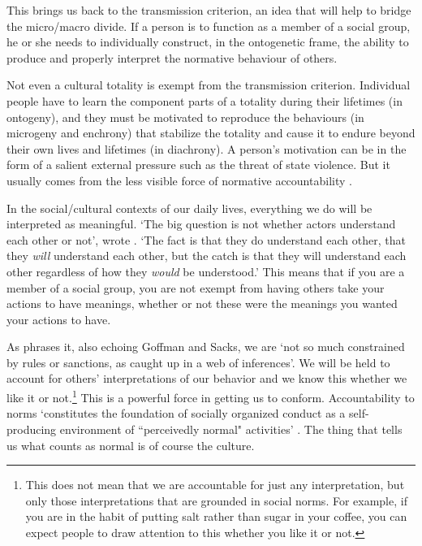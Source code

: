 This brings us back to the transmission criterion, an idea that will help to bridge the micro/macro divide. If a person is to function as a member of a social group, he or she needs to individually construct, in the ontogenetic frame, the ability to produce and properly interpret the normative behaviour of others. 



Not even a cultural totality is exempt from the transmission criterion. 
Individual people have to learn the component parts of a totality during 
their lifetimes (in ontogeny), and they must be motivated to reproduce the behaviours 
(in microgeny and enchrony) that stabilize the totality and cause it to endure beyond their own 
lives and lifetimes (in diachrony). A person's motivation can be in the form of a
salient external pressure such as the threat of state violence. But it usually comes from the less visible force of normative accountability \citep{heritage_garfinkel_1984,enfield_relationship_2013}. 



In the social/cultural contexts of our daily lives, everything we do will be interpreted as meaningful. \textquoteleft The big question is not whether 
actors understand each other or not', wrote \citet[367]{garfinkel_perception_1952}. \textquoteleft The fact is that they do understand each other, 
that they \textit{will} understand each other, but the catch is that 
they will understand each other regardless of how they \textit{would} 
be understood.' This means that if you are a member of a social group, you are not 
exempt from having others take your actions to have meanings, whether or 
not these were the meanings you wanted your actions to have. 



As \citet[321]{levinson_pragmatics_1983} phrases it, also echoing Goffman and Sacks, we 
are \textquoteleft not so much constrained by rules or sanctions, as caught up in a 
web of inferences'. We will be held to account for others' 
interpretations of our behavior and we know this whether we like it or 
not.\footnote{This does not mean that we are accountable for just any interpretation, but only those interpretations that are grounded in social norms. For example, if you are in the habit of putting salt rather than sugar in your coffee, you can expect people to draw attention to this whether you like it or not.} This is a powerful force in getting us to conform. Accountability 
to norms \textquoteleft constitutes the foundation of socially organized conduct as a 
self-producing environment of \textquotedblleft perceivedly normal" activities' 
\citep[119]{heritage_garfinkel_1984}. The thing that tells us what counts as normal is of 
course the culture. 




